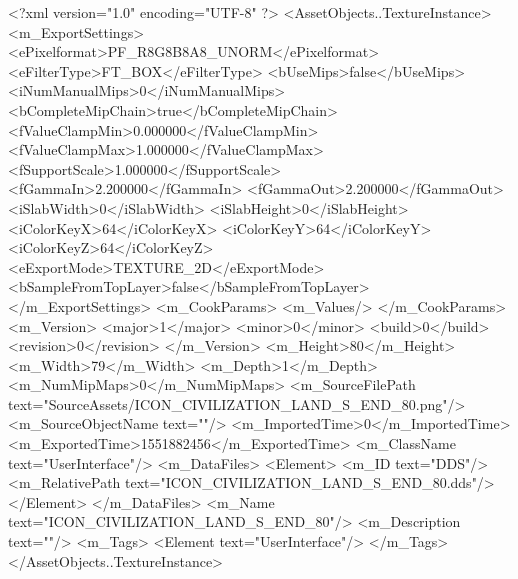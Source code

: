 <?xml version="1.0" encoding="UTF-8" ?>
<AssetObjects..TextureInstance>
	<m_ExportSettings>
		<ePixelformat>PF_R8G8B8A8_UNORM</ePixelformat>
		<eFilterType>FT_BOX</eFilterType>
		<bUseMips>false</bUseMips>
		<iNumManualMips>0</iNumManualMips>
		<bCompleteMipChain>true</bCompleteMipChain>
		<fValueClampMin>0.000000</fValueClampMin>
		<fValueClampMax>1.000000</fValueClampMax>
		<fSupportScale>1.000000</fSupportScale>
		<fGammaIn>2.200000</fGammaIn>
		<fGammaOut>2.200000</fGammaOut>
		<iSlabWidth>0</iSlabWidth>
		<iSlabHeight>0</iSlabHeight>
		<iColorKeyX>64</iColorKeyX>
		<iColorKeyY>64</iColorKeyY>
		<iColorKeyZ>64</iColorKeyZ>
		<eExportMode>TEXTURE_2D</eExportMode>
		<bSampleFromTopLayer>false</bSampleFromTopLayer>
	</m_ExportSettings>
	<m_CookParams>
		<m_Values/>
	</m_CookParams>
	<m_Version>
		<major>1</major>
		<minor>0</minor>
		<build>0</build>
		<revision>0</revision>
	</m_Version>
	<m_Height>80</m_Height>
	<m_Width>79</m_Width>
	<m_Depth>1</m_Depth>
	<m_NumMipMaps>0</m_NumMipMaps>
	<m_SourceFilePath text="SourceAssets/ICON_CIVILIZATION_LAND_S_END_80.png"/>
	<m_SourceObjectName text=""/>
	<m_ImportedTime>0</m_ImportedTime>
	<m_ExportedTime>1551882456</m_ExportedTime>
	<m_ClassName text="UserInterface"/>
	<m_DataFiles>
		<Element>
			<m_ID text="DDS"/>
			<m_RelativePath text="ICON_CIVILIZATION_LAND_S_END_80.dds"/>
		</Element>
	</m_DataFiles>
	<m_Name text="ICON_CIVILIZATION_LAND_S_END_80"/>
	<m_Description text=""/>
	<m_Tags>
		<Element text="UserInterface"/>
	</m_Tags>
</AssetObjects..TextureInstance>

